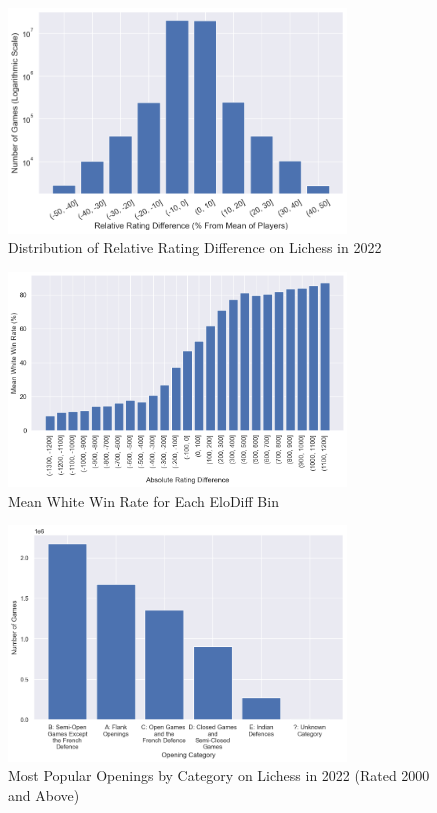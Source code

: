 \documentclass[a4paper, 11pt]{article}
\begin{document}
\begin{appendices}
\begin{figure}[H]
    \centering
    \caption{Distribution of Relative Rating Difference on Lichess in 2022}
    \label{fig:distributionOfRelativeRatingDifference}
    \includegraphics[width=0.8\textwidth]{Distribution of Relative Rating Difference.png}
\end{figure}

\begin{figure}[H]
    \centering
    \caption{Mean White Win Rate for Each EloDiff Bin}
    \label{fig:meanWhiteWinRateForEachEloDiffBin}
    \includegraphics[width=0.8\textwidth]{Mean White Win Rate for Each EloDiff Bin.png}
\end{figure}

\begin{figure}[H]
    \centering
    \caption{Most Popular Openings by Category on Lichess in 2022 (Rated 2000 and Above)}
    \label{fig:mostPopularOpeningsByCategoryRated2000Plus}
    \includegraphics[width=0.8\textwidth]{Most Popular Openings by Category (Rated 2000+).png}
\end{figure}


\end{appendices}
\end{document}
